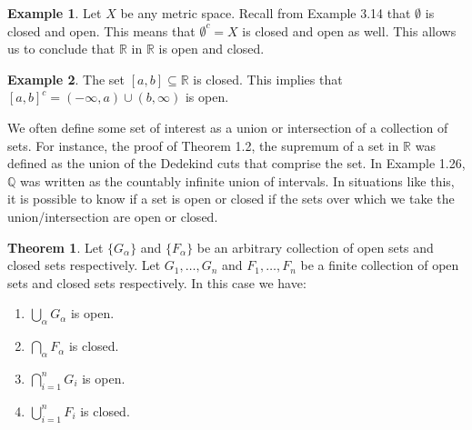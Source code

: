 \documentclass{article}
\newcommand{\R}{\mathbb{R}}
\newcommand{\Q}{\mathbb{Q}}
\theoremstyle{definition}
\newtheorem{theorem}{Theorem}[section]
\newtheorem{example}{Example}[section]
\begin{document}
\begin{example}
Let $ X $ be any metric space. Recall from Example 3.14 that $ \emptyset $ is closed and open. This means that $ \emptyset^c=X $ is closed and open as well. This allows us to conclude that $ \R $ in $ \R $ is open and closed.
\end{example}
\begin{example}
	The set $ [a,b]\subseteq \R $ is closed. This implies that $ [a,b]^c=(-\infty,a)\cup(b,\infty) $ is open.
\end{example}
We often define some set of interest as a union or intersection of a collection of sets. For instance, the proof of Theorem 1.2, the supremum of a set in $ \R $ was defined as the union of the Dedekind cuts that comprise the set. In Example 1.26, $ \Q $ was written as the countably infinite union of intervals. In situations like this, it is possible to know if a set is open or closed if the sets over which we take the union/intersection are open or closed. 
\begin{theorem}
	Let $ \{G_\alpha\} $ and $ \{F_\alpha\} $ be an arbitrary collection of open sets and closed sets respectively. Let $ G_1,\ldots,G_n $ and $ F_1,\ldots, F_n $ be a finite collection of open sets and closed sets respectively. In this case we have:
	\begin{enumerate}
		\item $ \bigcup_\alpha G_\alpha $ is open.
		\item $ \bigcap_\alpha F_\alpha $ is closed.
		\item $ \bigcap_{i=1}^n G_i$ is open.
		\item $ \bigcup_{i=1}^n F_i$ is closed.
	\end{enumerate}

\end{theorem}
\end{document}

